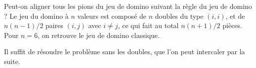 \begin{exo}[Dominos]
Peut-on aligner tous les pions du jeu de domino suivant la règle du jeu de domino ? Le jeu du domino à $n$ valeurs est composé de $n$ doubles du type $(i,i)$, et de $n(n-1)/2$ paires $(i,j)$ avec $i\neq j$, ce qui fait au total $n(n+1)/2$ pièces. Pour $n=6$, on retrouve le jeu de domino classique.
\begin{center}
\end{center}
\begin{hint}
Il suffit de résoudre le problème sans les doubles, que l'on peut intercaler par la suite.

\end{hint}
\end{exo}
\newpage

